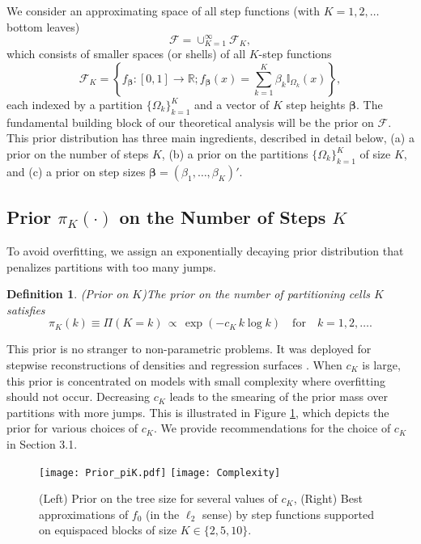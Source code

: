 \documentclass{article}
\newcommand{\1}{\mathbb{I}}
\newcommand{\R}{\mathbb{R}}
\newcommand{\bm}[1]{\boldsymbol{#1}}
\def\b{\bm{\beta}}
\def\b{\bm{\beta}}
\newtheorem{definition}{Definition}[section]
\theoremstyle{assumption}
\begin{document}
 
We consider an approximating space of all step functions (with $K=1,2,\dots$ bottom leaves)
\begin{equation}\label{shells}
\mathcal{F}=\cup_{K=1}^\infty\mathcal{F}_K,
\end{equation}
which consists of smaller  spaces (or shells) of all $K$-step functions
$$
\mathcal{F}_K=\left\{f_{\b}:[0,1]\rightarrow\R;  f_{\b}(x)=\sum_{k=1}^{K} \beta_k \1_{\Omega_k}(x)\right\},
$$
each indexed by a partition $\{\Omega_k\}_{k=1}^K$ and a vector of $K$ step heights $\b$. The fundamental building block of our theoretical analysis will be the prior  on $\mathcal{F}$. This prior distribution has three main ingredients, described in detail below, (a) a prior on the number of steps $K$, (b) a prior on the partitions $\{\Omega_k\}_{k=1}^K$ of size $K$, and (c) a prior on step sizes $\b=(\beta_1,\dots,\beta_K)'$.

 \vspace{-0.1cm}
 \subsection{Prior  $\pi_K(\cdot)$ on the Number of Steps $K$ }
To avoid overfitting, we assign an exponentially decaying prior distribution that penalizes partitions with too many jumps.
\begin{definition}(Prior on $K$)\label{prior_K}
The prior on the number of partitioning cells $K$ satisfies
\begin{equation}\label{priorK}
\pi_K(k)\equiv\Pi(K=k)\,\propto\, \exp(-c_K\, k\log k)\quad\text{for}\quad k=1,2,\dots.
\end{equation}
\end{definition}
 This prior is no stranger to non-parametric problems. It was deployed for stepwise  reconstructions of densities \cite{Scricciolo2007,Liu2015}  and regression surfaces \cite{coram}. When $c_K$ is large, this prior is concentrated on models with small complexity where overfitting should not occur. Decreasing $c_K$ leads to the smearing  of the prior mass over partitions with more jumps. This is illustrated in Figure \ref{fig:prior}, which depicts the prior for various choices of $c_K$. 
 We provide recommendations for the choice of $c_K$ in {Section 3.1.}

\vspace{-0.3cm}
\begin{figure}[h]
  \centering
  \texttt{[image: Prior\_piK.pdf]}
   \texttt{[image: Complexity]}
  \caption{(Left) Prior on the tree size for several values of $c_K$, (Right) Best approximations of $f_0$ (in the $\ell_2$ sense) by step functions supported on equispaced blocks  of size $K \in \{2, 5, 10\}$. }
  \label{fig:prior}
\end{figure}
\end{document}
